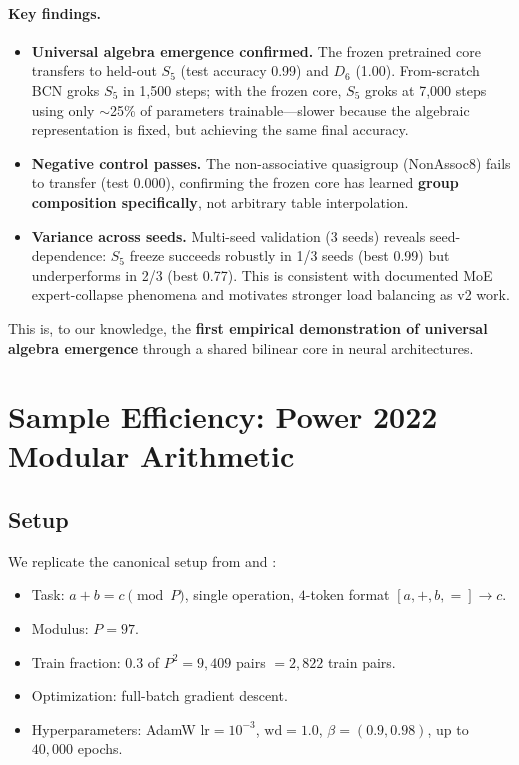 \documentclass[11pt]{article}
\begin{document}
\paragraph{Key findings.}
\begin{itemize}
\item \textbf{Universal algebra emergence confirmed.} The frozen
    pretrained core transfers to held-out $S_5$ (test accuracy 0.99)
    and $D_6$ (1.00). From-scratch BCN groks $S_5$ in 1,500 steps;
    with the frozen core, $S_5$ groks at 7,000 steps using only
    $\sim$25\% of parameters trainable---slower because the algebraic
    representation is fixed, but achieving the same final accuracy.
\item \textbf{Negative control passes.} The non-associative
    quasigroup (NonAssoc8) fails to transfer (test 0.000), confirming
    the frozen core has learned \textbf{group composition
    specifically}, not arbitrary table interpolation.
\item \textbf{Variance across seeds.} Multi-seed validation (3 seeds)
    reveals seed-dependence: $S_5$ freeze succeeds robustly in 1/3
    seeds (best 0.99) but underperforms in 2/3 (best 0.77). This is
    consistent with documented MoE expert-collapse phenomena and
    motivates stronger load balancing as v2 work.
\end{itemize}

This is, to our knowledge, the \textbf{first empirical demonstration of
universal algebra emergence} through a shared bilinear core in neural
architectures.

\section{Sample Efficiency: Power 2022 Modular Arithmetic}
\label{sec:power}

\subsection{Setup}

We replicate the canonical setup from \citet{power2022grokking} and
\citet{nanda2023progress}:
\begin{itemize}
\item Task: $a + b = c \pmod{P}$, single operation, $4$-token format
    $[a, +, b, =] \to c$.
\item Modulus: $P = 97$.
\item Train fraction: $0.3$ of $P^2 = 9{,}409$ pairs $= 2{,}822$ train pairs.
\item Optimization: full-batch gradient descent.
\item Hyperparameters: AdamW $\text{lr} = 10^{-3}$, $\text{wd} = 1.0$,
    $\beta = (0.9, 0.98)$, up to $40{,}000$ epochs.
\end{itemize}
\end{document}
